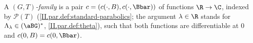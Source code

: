 A \emph{$(G,T)$-family} is a pair $c=(c(\cdot,B),c(\cdot,\Bbar))$ of functions $\R\to\C$, indexed by $\mathcal P(T)$
(\cref{II.par.def:standard-parabolics}; the argument $\lambda\in\R$ stands for $\Lambda_\lambda\in(\aBG)^*$, \cref{II.par.def:theta}), such that both
functions are differentiable at $0$ and $c(0,B)=c(0,\Bbar)$.
